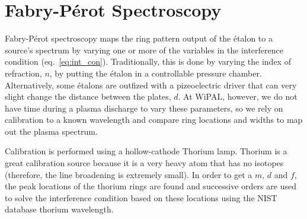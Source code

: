 \documentclass{article}
\begin{document}

\section{Fabry-P\'{e}rot Spectroscopy}
Fabry-P\'{e}rot spectroscopy maps the ring pattern output of the \'{e}talon to a source's spectrum by varying one or more of the variables in the interference condition (eq.~\ref{eq:int_con}). Traditionally, this is done by varying the index of refraction, $n$, by putting the \'{e}talon in a controllable pressure chamber. Alternatively, some \'{e}talons are outfized with a pizeoelectric driver that can very slight change the distance between the plates, $d$. 	At WiPAL, however, we do not have time during a plasma discharge to vary these parameters, so we rely on calibration to a known wavelength and compare ring locations and widths to map out the plasma spectrum.

Calibration is performed using a hollow-cathode Thorium lamp. Thorium is a great calibration source because it is a very heavy atom that has no isotopes (therefore, the line broadening is extremely small). In order to get a $m$, $d$ and $f$, the peak locations of the thorium rings are found and successive orders are used to solve the interference condition based on these locations using the NIST database thorium wavelength. 
\end{document}
